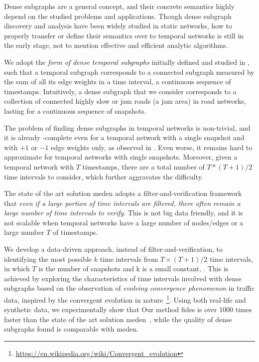 Dense subgraphs are a general concept, and their concrete semantics highly depend on the studied problems and applications. Though  dense subgraph discovery and analysis have been widely studied in static networks, how to properly transfer or define their semantics over to temporal networks is still in the early stage, not to mention effective and efficient analytic algorithms.

We adopt the {\em form of dense temporal subgraphs} initially defined and studied in \cite{BogdanovMS11}, such that a temporal subgraph corresponds to a connected subgraph measured by the sum of all its edge weights in a time interval, \ie  a continuous sequence of timestamps. Intuitively, a dense subgraph that we consider  corresponds to a  collection of connected highly slow or jam roads (\ie  a jam area) in road networks, lasting for a continuous sequence of snapshots.


The problem of  finding dense subgraphs in temporal networks is non-trivial, and it is already \NP-complete even for a temporal network with a single snapshot and with $+1$ or $-1$ edge weights only, as observed in \cite{BogdanovMS11}. Even worse, it remains hard to approximate for temporal networks  with single snapshots.
Moreover, given a temporal network with $T$ timestamps, there are a total number of $T*(T+1)/2$ time intervals to consider, which further aggravates the difficulty.

The state of the art solution {\sc meden} \cite{BogdanovMS11} adopts a filter-and-verification framework that {\em even if a large portion of time intervals are filtered, there often remain a large number of time intervals to verify}. This is not big data friendly, and it is not scalable when temporal networks have a large number of nodes/edges or a large number $T$ of timestamps.


We develop a data-driven approach, instead of filter-and-verification, to  identifying the most possible $k$ time intervals from $T \times (T + 1)/2$ time intervals, in which $T$ is the number of snapshots and k is a small constant, . This is achieved by exploring the characteristics of time intervals involved with dense subgraphs based on the observation of {\em evolving convergence phenomenon} in traffic data, inspired by the convergent evolution in nature~\footnote{\small \url{https://en.wikipedia.org/wiki/Convergent_evolution}}. Using both real-life and synthetic data, we experimentally show that Our method {\sc fides} is over 1000 times faster than the state of the art solution {\sc meden}~\cite{BogdanovMS11}, while the quality of dense subgraphs found is comparable with {\sc meden}.

